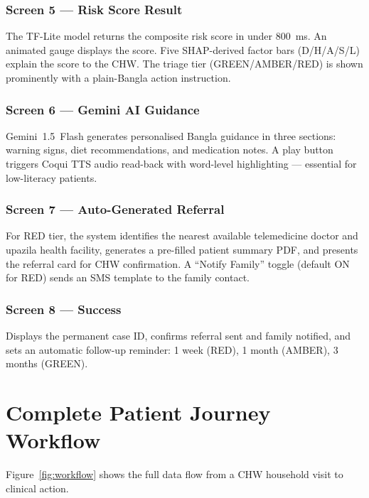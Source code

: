 \documentclass[12pt, a4paper]{article}
\begin{document}
\subsubsection{Screen 5 — Risk Score Result}
The TF-Lite model returns the composite risk score in under 800~ms. An animated gauge displays the score. Five SHAP-derived factor bars (D/H/A/S/L) explain the score to the CHW. The triage tier (GREEN/AMBER/RED) is shown prominently with a plain-Bangla action instruction.

\subsubsection{Screen 6 — Gemini AI Guidance}
Gemini~1.5~Flash generates personalised Bangla guidance in three sections: warning signs, diet recommendations, and medication notes. A play button triggers Coqui TTS audio read-back with word-level highlighting — essential for low-literacy patients.

\subsubsection{Screen 7 — Auto-Generated Referral}
For RED tier, the system identifies the nearest available telemedicine doctor and upazila health facility, generates a pre-filled patient summary PDF, and presents the referral card for CHW confirmation. A ``Notify Family'' toggle (default ON for RED) sends an SMS template to the family contact.

\subsubsection{Screen 8 — Success}
Displays the permanent case ID, confirms referral sent and family notified, and sets an automatic follow-up reminder: 1 week (RED), 1 month (AMBER), 3 months (GREEN).

\section{Complete Patient Journey Workflow}

Figure~\ref{fig:workflow} shows the full data flow from a CHW household visit to clinical action.
\end{document}
